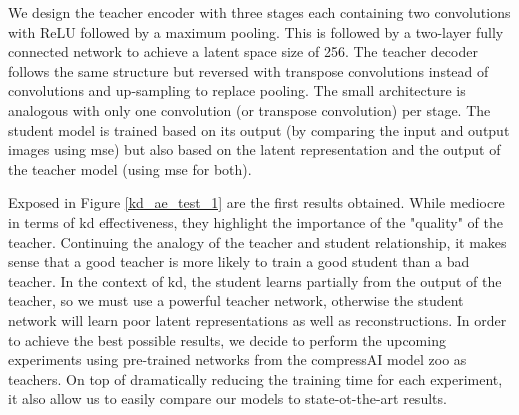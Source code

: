 We design the teacher encoder with three stages each containing two convolutions with ReLU followed by a maximum pooling. This is followed by a two-layer fully connected network to achieve a latent space size of 256. The teacher decoder follows the same structure but reversed with transpose convolutions instead of convolutions and up-sampling to replace pooling. The small architecture is analogous with only one convolution (or transpose convolution) per stage. The student model is trained based on its output (by comparing the input and output images using \acrshort{mse}) but also based on the latent representation and the output of the teacher model (using \acrshort{mse} for both).

Exposed in Figure \ref{kd_ae_test_1} are the first results obtained. While mediocre in terms of \acrshort{kd} effectiveness, they highlight the importance of the "quality" of the teacher. Continuing the analogy of the teacher and student relationship, it makes sense that a good teacher is more likely to train a good student than a bad teacher. In the context of \acrshort{kd}, the student learns partially from the output of the teacher, so we must use a powerful teacher network, otherwise the student network will learn poor latent representations as well as reconstructions. In order to achieve the best possible results, we decide to perform the upcoming experiments using pre-trained networks from the compressAI model zoo as teachers. On top of dramatically reducing the training time for each experiment, it also allow us to easily compare our models to state-ot-the-art results.

